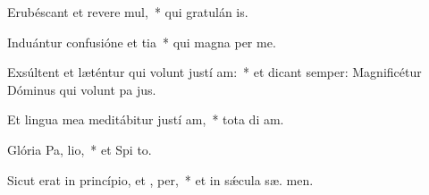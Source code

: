 \item Erubéscant et revere mul,~* qui gratulán  is.
\item Induántur confusióne et tia~* qui magna  per me.
\item Exsúltent et læténtur qui volunt justí am:~* et dicant semper: Magnificétur Dóminus qui volunt pa  jus.
\item Et lingua mea meditábitur justí am,~* tota di  am.
\item Glória Pa,  lio,~* et Spi to.
\item Sicut erat in princípio, et ,  per,~* et in sǽcula sæ. men.
